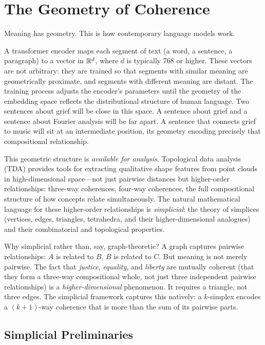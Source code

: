 \section{The Geometry of Coherence}
\label{sec:geometry}


Meaning has geometry. This is how contemporary language models work.

A transformer encoder maps each segment of text (a word, a sentence, a paragraph) to a vector in $\mathbb{R}^d$, where $d$ is typically 768 or higher. These vectors are not arbitrary: they are trained so that segments with similar meaning are geometrically proximate, and segments with different meaning are distant. The training process adjusts the encoder's parameters until the geometry of the embedding space reflects the distributional structure of human language. Two sentences about grief will be close in this space. A sentence about grief and a sentence about Fourier analysis will be far apart. A sentence that connects grief to music will sit at an intermediate position, its geometry encoding precisely that compositional relationship.

This geometric structure is \emph{available for analysis}. Topological data analysis (TDA) provides tools for extracting qualitative shape features from point clouds in high-dimensional space---not just pairwise distances but higher-order relationships: three-way coherences, four-way coherences, the full compositional structure of how concepts relate simultaneously. The natural mathematical language for these higher-order relationships is \emph{simplicial}: the theory of simplices (vertices, edges, triangles, tetrahedra, and their higher-dimensional analogues) and their combinatorial and topological properties.

Why simplicial rather than, say, graph-theoretic? A graph captures pairwise relationships: $A$ is related to $B$, $B$ is related to $C$. But meaning is not merely pairwise. The fact that \emph{justice}, \emph{equality}, and \emph{liberty} are mutually coherent (that they form a three-way compositional whole, not just three independent pairwise relationships) is a \emph{higher-dimensional} phenomenon. It requires a triangle, not three edges. The simplicial framework captures this natively: a $k$-simplex encodes a $(k+1)$-way coherence that is more than the sum of its pairwise parts.


\subsection{Simplicial Preliminaries}

